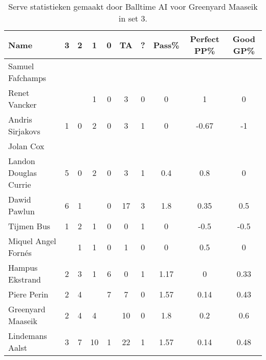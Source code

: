 \begin{table}[ht!]
  \centering
  \scriptsize
  \begin{tabular}{|l|c|c|c|c|c|c|c|c|c|} \hline
    \textbf{Name} & 3 & 2 & 1 & 0 & TA & ? & Pass\% & Perfect PP\% & Good GP\% \\ \hline
    Samuel Fafchamps &   &   &   &   &   &   &   &   &   \\
    Renet Vancker &   &   & 1 & 0 & 3 & 0 & 0 & 1 & 0 \\
    Andris Sirjakovs & 1 & 0 & 2 & 0 & 3 & 1 & 0 & -0.67 & -1 \\
    Jolan Cox &   &   &   &   &   &   &   &   &   \\
    Landon Douglas Currie & 5 & 0 & 2 & 0 & 3 & 1 & 0.4 & 0.8 & 0 \\
    Dawid Pawlun & 6 & 1 &   & 0 & 17 & 3 & 1.8 & 0.35 & 0.5 \\
    Tijmen Bus & 1 & 2 & 1 & 0 & 0 & 1 & 0 & -0.5 & -0.5 \\
    Miquel Angel Fornés &   & 1 & 1 & 0 & 1 & 0 & 0 & 0.5 & 0 \\
    Hampus Ekstrand & 2 & 3 & 1 & 6 & 0 & 1 & 1.17 & 0 & 0.33 \\
    Piere Perin & 2 & 4 &   & 7 & 7 & 0 & 1.57 & 0.14 & 0.43 \\
    Greenyard Maaseik & 2 & 4 & 4 &   & 10 & 0 & 1.8 & 0.2 & 0.6 \\
    Lindemans Aalst & 3 & 7 & 10 & 1 & 22 & 1 & 1.57 & 0.14 & 0.48 \\ \hline
  \end{tabular}
  \caption[Receive statistieken gemaakt door Balltime AI voor Greenyard Maaseik in set 3]{\label{tab:PL1ReceiveGreenyard3}Serve statistieken gemaakt door Balltime AI voor Greenyard Maaseik in set 3.}
\end{table}

